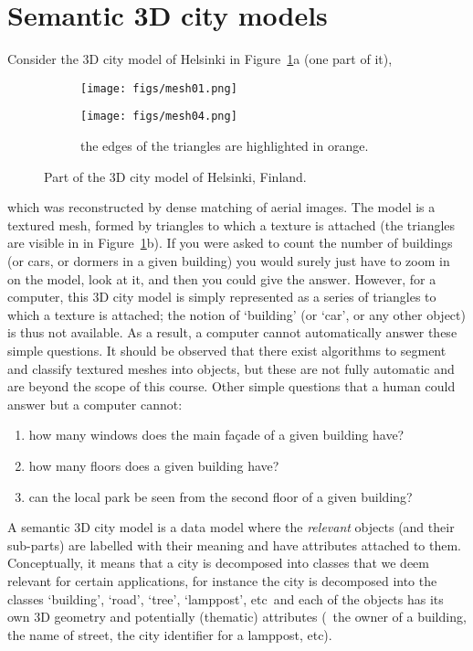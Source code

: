 %
\section{Semantic 3D city models}

Consider the 3D city model of Helsinki in Figure~\ref{fig:mesh}a (one part of it),
\begin{figure}
  \centering
  \begin{subfigure}[b]{0.8\linewidth}
    \centering
    \texttt{[image: figs/mesh01.png]}
    \caption{}
  \end{subfigure}
  \begin{subfigure}[b]{0.8\linewidth}
    \centering
    \texttt{[image: figs/mesh04.png]}
    \caption{the edges of the triangles are highlighted in orange.}
  \end{subfigure}
\caption{Part of the 3D city model of Helsinki, Finland.}%
\label{fig:mesh}
\end{figure}
which was reconstructed by dense matching of aerial images.
The model is a textured mesh, formed by triangles to which a texture is attached (the triangles are visible in in Figure~\ref{fig:mesh}b).
If you were asked to count the number of buildings (or cars, or dormers in a given building) you would surely just have to zoom in on the model, look at it, and then you could give the answer.
However, for a computer, this 3D city model is simply represented as a series of triangles to which a texture is attached; the notion of `building' (or `car', or any other object) is thus not available.
As a result, a computer cannot automatically answer these simple questions.
It should be observed that there exist algorithms to segment and classify textured meshes into objects, but these are not fully automatic and are beyond the scope of this course.
Other simple questions that a human could answer but a computer cannot:
\begin{enumerate}
  \item how many windows does the main façade of a given building have?
  \item how many floors does a given building have?
  \item can the local park be seen from the second floor of a given building?
\end{enumerate}

%

A semantic 3D city model is a data model where the \emph{relevant} objects (and their sub-parts) are labelled with their meaning and have attributes attached to them.
Conceptually, it means that a city is decomposed into classes that we deem relevant for certain applications, for instance the city is decomposed into the classes `building', `road', `tree', `lamppost', etc\ and each of the objects has its own 3D geometry and potentially (thematic) attributes (\eg\ the owner of a building, the name of street, the city identifier for a lamppost, etc).

